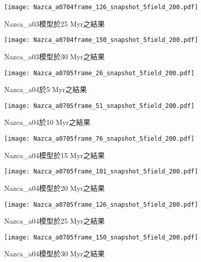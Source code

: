 \begin{figure*}[ht!]
    \centering
    \texttt{[image: Nazca\_a0704frame\_126\_snapshot\_5field\_200.pdf]}
    \caption{Nazca\_a03模型於25 Myr之結果}
\end{figure*}

\begin{figure*}[ht!]
    \centering
    \texttt{[image: Nazca\_a0704frame\_150\_snapshot\_5field\_200.pdf]}
    \caption{Nazca\_a03模型於30 Myr之結果}
    \label{fig::Nazca_03_150}
\end{figure*}

\begin{figure*}[ht!]
    \centering
    \texttt{[image: Nazca\_a0705frame\_26\_snapshot\_5field\_200.pdf]}
    \caption{Nazca\_a04於5 Myr之結果}
    \label{fig::Nazca_04_26}
\end{figure*}

\begin{figure*}[ht!]
    \centering
    \texttt{[image: Nazca\_a0705frame\_51\_snapshot\_5field\_200.pdf]}
    \caption{Nazca\_a04於10 Myr之結果}
\end{figure*}

\begin{figure*}[ht!]
    \centering
    \texttt{[image: Nazca\_a0705frame\_76\_snapshot\_5field\_200.pdf]}
    \caption{Nazca\_a04模型於15 Myr之結果}
\end{figure*}

\begin{figure*}[ht!]
    \centering
    \texttt{[image: Nazca\_a0705frame\_101\_snapshot\_5field\_200.pdf]}
    \caption{Nazca\_a04模型於20 Myr之結果}
\end{figure*}

\begin{figure*}[ht!]
    \centering
    \texttt{[image: Nazca\_a0705frame\_126\_snapshot\_5field\_200.pdf]}
    \caption{Nazca\_a04模型於25 Myr之結果}
\end{figure*}

\begin{figure*}[ht!]
    \centering
    \texttt{[image: Nazca\_a0705frame\_150\_snapshot\_5field\_200.pdf]}
    \caption{Nazca\_a04模型於30 Myr之結果}
    \label{fig::Nazca_04_150}
\end{figure*}